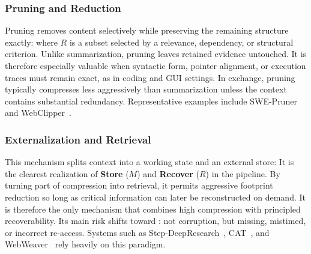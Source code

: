 \subsubsection{Pruning and Reduction} 
Pruning removes content selectively while preserving the remaining structure exactly:
where \(R\) is a subset selected by a relevance, dependency, or structural criterion. Unlike summarization, pruning leaves retained evidence untouched. It is therefore especially valuable when syntactic form, pointer alignment, or execution traces must remain exact, as in coding and GUI settings. In exchange, pruning typically compresses less aggressively than summarization unless the context contains substantial redundancy. Representative examples include SWE-Pruner~\citep{wang2026sweprunerselfadaptivecontextpruning} and WebClipper~\citep{wang2026webclipperefficientevolutionweb}.

\subsubsection{Externalization and Retrieval} 
This mechanism splits context into a working state and an external store:
It is the clearest realization of \textbf{Store} ($M$) and \textbf{Recover} ($R$) in the pipeline. By turning part of compression into retrieval, it permits aggressive footprint reduction so long as critical information can later be reconstructed on demand. It is therefore the only mechanism that combines high compression with principled recoverability. Its main risk shifts toward \fthree: not corruption, but missing, mistimed, or incorrect re-access. Systems such as Step-DeepResearch~\citep{hu2025stepdeepresearchtechnicalreport}, CAT~\citep{liu2025contexttoolcontextmanagement}, and WebWeaver~\citep{li2025webweaverstructuringwebscaleevidence} rely heavily on this paradigm.

